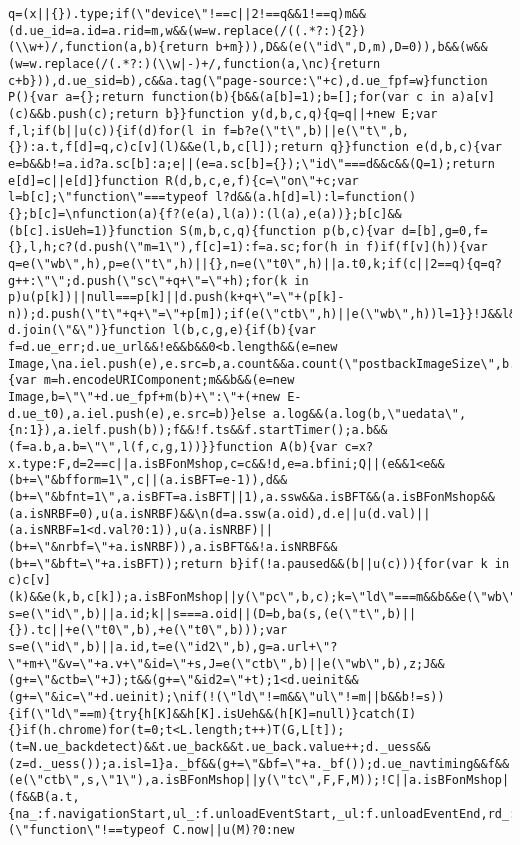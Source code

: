 \documentclass[
]{article}
\begin{document}
\begin{verbatim}
q=(x||{}).type;if(\"device\"!==c||2!==q&&1!==q)m&&(d.ue_id=a.id=a.rid=m,w&&(w=w.replace(/((.*?:){2})(\\w+)/,function(a,b){return b+m})),D&&(e(\"id\",D,m),D=0)),b&&(w&&(w=w.replace(/(.*?:)(\\w|-)+/,function(a,\nc){return c+b})),d.ue_sid=b),c&&a.tag(\"page-source:\"+c),d.ue_fpf=w}function P(){var a={};return function(b){b&&(a[b]=1);b=[];for(var c in a)a[v](c)&&b.push(c);return b}}function y(d,b,c,q){q=q||+new E;var f,l;if(b||u(c)){if(d)for(l in f=b?e(\"t\",b)||e(\"t\",b,{}):a.t,f[d]=q,c)c[v](l)&&e(l,b,c[l]);return q}}function e(d,b,c){var e=b&&b!=a.id?a.sc[b]:a;e||(e=a.sc[b]={});\"id\"===d&&c&&(Q=1);return e[d]=c||e[d]}function R(d,b,c,e,f){c=\"on\"+c;var l=b[c];\"function\"===typeof l?d&&(a.h[d]=l):l=function(){};b[c]=\nfunction(a){f?(e(a),l(a)):(l(a),e(a))};b[c]&&(b[c].isUeh=1)}function S(m,b,c,q){function p(b,c){var d=[b],g=0,f={},l,h;c?(d.push(\"m=1\"),f[c]=1):f=a.sc;for(h in f)if(f[v](h)){var q=e(\"wb\",h),p=e(\"t\",h)||{},n=e(\"t0\",h)||a.t0,k;if(c||2==q){q=q?g++:\"\";d.push(\"sc\"+q+\"=\"+h);for(k in p)u(p[k])||null===p[k]||d.push(k+q+\"=\"+(p[k]-n));d.push(\"t\"+q+\"=\"+p[m]);if(e(\"ctb\",h)||e(\"wb\",h))l=1}}!J&&l&&d.push(\"ctb=1\");return d.join(\"&\")}function l(b,c,g,e){if(b){var f=d.ue_err;d.ue_url&&!e&&b&&0<b.length&&(e=new Image,\na.iel.push(e),e.src=b,a.count&&a.count(\"postbackImageSize\",b.length));if(w){var m=h.encodeURIComponent;m&&b&&(e=new Image,b=\"\"+d.ue_fpf+m(b)+\":\"+(+new E-d.ue_t0),a.iel.push(e),e.src=b)}else a.log&&(a.log(b,\"uedata\",{n:1}),a.ielf.push(b));f&&!f.ts&&f.startTimer();a.b&&(f=a.b,a.b=\"\",l(f,c,g,1))}}function A(b){var c=x?x.type:F,d=2==c||a.isBFonMshop,c=c&&!d,e=a.bfini;Q||(e&&1<e&&(b+=\"&bfform=1\",c||(a.isBFT=e-1)),d&&(b+=\"&bfnt=1\",a.isBFT=a.isBFT||1),a.ssw&&a.isBFT&&(a.isBFonMshop&&(a.isNRBF=0),u(a.isNRBF)&&\n(d=a.ssw(a.oid),d.e||u(d.val)||(a.isNRBF=1<d.val?0:1)),u(a.isNRBF)||(b+=\"&nrbf=\"+a.isNRBF)),a.isBFT&&!a.isNRBF&&(b+=\"&bft=\"+a.isBFT));return b}if(!a.paused&&(b||u(c))){for(var k in c)c[v](k)&&e(k,b,c[k]);a.isBFonMshop||y(\"pc\",b,c);k=\"ld\"===m&&b&&e(\"wb\",b);var s=e(\"id\",b)||a.id;k||s===a.oid||(D=b,ba(s,(e(\"t\",b)||{}).tc||+e(\"t0\",b),+e(\"t0\",b)));var s=e(\"id\",b)||a.id,t=e(\"id2\",b),g=a.url+\"?\"+m+\"&v=\"+a.v+\"&id=\"+s,J=e(\"ctb\",b)||e(\"wb\",b),z;J&&(g+=\"&ctb=\"+J);t&&(g+=\"&id2=\"+t);1<d.ueinit&&(g+=\"&ic=\"+d.ueinit);\nif(!(\"ld\"!=m&&\"ul\"!=m||b&&b!=s)){if(\"ld\"==m){try{h[K]&&h[K].isUeh&&(h[K]=null)}catch(I){}if(h.chrome)for(t=0;t<L.length;t++)T(G,L[t]);(t=N.ue_backdetect)&&t.ue_back&&t.ue_back.value++;d._uess&&(z=d._uess());a.isl=1}a._bf&&(g+=\"&bf=\"+a._bf());d.ue_navtiming&&f&&(e(\"ctb\",s,\"1\"),a.isBFonMshop||y(\"tc\",F,F,M));!C||a.isBFonMshop||U||(f&&B(a.t,{na_:f.navigationStart,ul_:f.unloadEventStart,_ul:f.unloadEventEnd,rd_:f.redirectStart,_rd:f.redirectEnd,fe_:f.fetchStart,lk_:f.domainLookupStart,_lk:f.domainLookupEnd,\nco_:f.connectStart,_co:f.connectEnd,sc_:f.secureConnectionStart,rq_:f.requestStart,rs_:f.responseStart,_rs:f.responseEnd,dl_:f.domLoading,di_:f.domInteractive,de_:f.domContentLoadedEventStart,_de:f.domContentLoadedEventEnd,_dc:f.domComplete,ld_:f.loadEventStart,_ld:f.loadEventEnd,ntd:(\"function\"!==typeof C.now||u(M)?0:new 
\end{verbatim}
\end{document}
